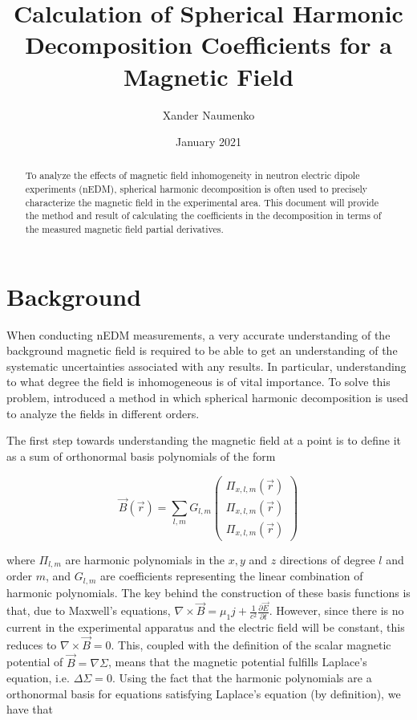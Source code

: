 \documentclass{article}
\title{Calculation of Spherical Harmonic Decomposition Coefficients for a Magnetic Field}
\author{Xander Naumenko }
\date{January 2021}
\begin{document}
\maketitle
\begin{abstract}
    To analyze the effects of magnetic field inhomogeneity in neutron electric dipole experiments (nEDM), spherical harmonic decomposition is often used to precisely characterize the magnetic field in the experimental area. This document will provide the method and result of calculating the coefficients in the decomposition in terms of the measured magnetic field partial derivatives. 
\end{abstract}

\section{Background}

When conducting nEDM measurements, a very accurate understanding of the background magnetic field is required to be able to get an understanding of the systematic uncertainties associated with any results. In particular, understanding to what degree the field is inhomogeneous is of vital importance. To solve this problem, \cite{non-uniformity} introduced a method in which spherical harmonic decomposition is used to analyze the fields in different orders. 

The first step towards understanding the magnetic field at a point is to define it as a sum of orthonormal basis polynomials of the form

\begin{equation} \label{basis}
    \vec B(\vec r)=\sum_{l, m}G_{l, m}\begin{pmatrix}\Pi_{x, l, m}(\vec r)\\ \Pi_{x, l, m}(\vec r)\\ \Pi_{x, l, m}(\vec r)\end{pmatrix}
\end{equation}

where $\Pi_{l, m}$ are harmonic polynomials in the $x, y$ and $z$ directions of degree $l$ and order $m$, and $G_{l, m}$ are coefficients representing the linear combination of harmonic polynomials. The key behind the construction of these basis functions is that, due to Maxwell's equations, $\nabla\times \vec B=\mu_1j+\frac1{c^2}\frac{\partial \vec E}{\partial t}$. However, since there is no current in the experimental apparatus and the electric field will be constant, this reduces to $\nabla\times\vec B=0$. This, coupled with the definition of the scalar magnetic potential of $\vec B=\nabla \Sigma$, means that the magnetic potential fulfills Laplace's equation, i.e. $\Delta\Sigma=0$. Using the fact that the harmonic polynomials are a orthonormal basis for equations satisfying Laplace's equation (by definition), we have that 
\end{document}
